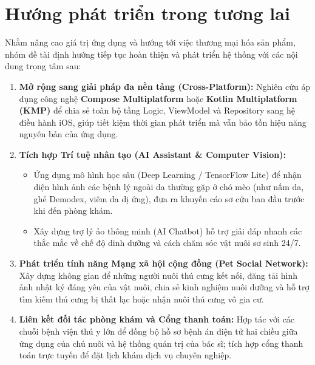 \section{Hướng phát triển trong tương lai}
\label{sec:huong_phat_trien}

Nhằm nâng cao giá trị ứng dụng và hướng tới việc thương mại hóa sản phẩm, nhóm đề tài định hướng tiếp tục hoàn thiện và phát triển hệ thống với các nội dung trọng tâm sau:

\begin{enumerate}
    \item \textbf{Mở rộng sang giải pháp đa nền tảng (Cross-Platform):} Nghiên cứu áp dụng công nghệ \textbf{Compose Multiplatform} hoặc \textbf{Kotlin Multiplatform (KMP)} để chia sẻ toàn bộ tầng Logic, ViewModel và Repository sang hệ điều hành iOS, giúp tiết kiệm thời gian phát triển mà vẫn bảo tồn hiệu năng nguyên bản của ứng dụng.
    \item \textbf{Tích hợp Trí tuệ nhân tạo (AI Assistant \& Computer Vision):}
    \begin{itemize}
        \item Ứng dụng mô hình học sâu (Deep Learning / TensorFlow Lite) để nhận diện hình ảnh các bệnh lý ngoài da thường gặp ở chó mèo (như nấm da, ghẻ Demodex, viêm da dị ứng), đưa ra khuyến cáo sơ cứu ban đầu trước khi đến phòng khám.
        \item Xây dựng trợ lý ảo thông minh (AI Chatbot) hỗ trợ giải đáp nhanh các thắc mắc về chế độ dinh dưỡng và cách chăm sóc vật nuôi sơ sinh 24/7.
    \end{itemize}
    \item \textbf{Phát triển tính năng Mạng xã hội cộng đồng (Pet Social Network):} Xây dựng không gian để những người nuôi thú cưng kết nối, đăng tải hình ảnh nhật ký đáng yêu của vật nuôi, chia sẻ kinh nghiệm nuôi dưỡng và hỗ trợ tìm kiếm thú cưng bị thất lạc hoặc nhận nuôi thú cưng vô gia cư.
    \item \textbf{Liên kết đối tác phòng khám và Cổng thanh toán:} Hợp tác với các chuỗi bệnh viện thú y lớn để đồng bộ hồ sơ bệnh án điện tử hai chiều giữa ứng dụng của chủ nuôi và hệ thống quản trị của bác sĩ; tích hợp cổng thanh toán trực tuyến để đặt lịch khám dịch vụ chuyên nghiệp.
\end{enumerate}
